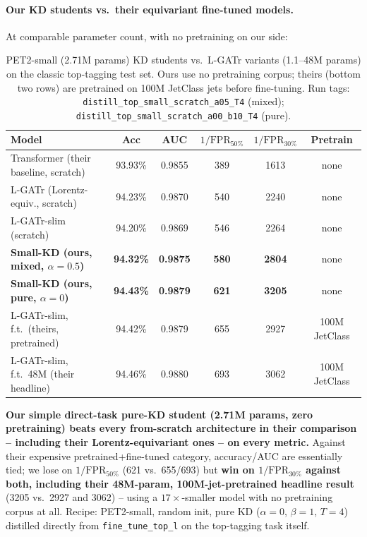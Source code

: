 \paragraph{Our KD students vs.\ their equivariant fine-tuned models.} At
comparable parameter count, with no pretraining on our side:

\begin{table}[h]
    \centering
    \small
    \begin{tabular}{lccccc}
        \toprule
        Model & Acc & AUC & $1/\mathrm{FPR}_{50\%}$ & $1/\mathrm{FPR}_{30\%}$ & Pretrain \\
        \midrule
        Transformer (their baseline, scratch) & 93.93\% & 0.9855 & 389 & 1613 & none \\
        L-GATr (Lorentz-equiv., scratch) & 94.23\% & 0.9870 & 540 & 2240 & none \\
        L-GATr-slim (scratch) & 94.20\% & 0.9869 & 546 & 2264 & none \\
        \textbf{Small-KD (ours, mixed, $\alpha{=}0.5$)} & \textbf{94.32\%} & \textbf{0.9875} & \textbf{580} & \textbf{2804} & none \\
        \textbf{Small-KD (ours, pure, $\alpha{=}0$)} & \textbf{94.43\%} & \textbf{0.9879} & \textbf{621} & \textbf{3205} & none \\
        L-GATr-slim, f.t.\ (theirs, pretrained) & 94.42\% & 0.9879 & 655 & 2927 & 100M JetClass \\
        L-GATr-slim, f.t.\ 48M (their headline) & 94.46\% & 0.9880 & 693 & 3062 & 100M JetClass \\
        \bottomrule
    \end{tabular}
    \caption{PET2-small (2.71M params) KD students vs.\ L-GATr variants
    (1.1--48M params) on the classic top-tagging test set. Ours use no
    pretraining corpus; theirs (bottom two rows) are pretrained on 100M
    JetClass jets before fine-tuning. Run tags:
    \texttt{distill\_top\_small\_scratch\_a05\_T4} (mixed);
    \texttt{distill\_top\_small\_scratch\_a00\_b10\_T4} (pure).}
    \label{tab:lgatr-comparison}
\end{table}

\textbf{Our simple direct-task pure-KD student (2.71M params, zero
pretraining) beats every from-scratch architecture in their comparison --
including their Lorentz-equivariant ones -- on every metric.} Against their
expensive pretrained+fine-tuned category, accuracy/AUC are essentially tied;
we lose on $1/\mathrm{FPR}_{50\%}$ (621 vs.\ 655/693) but \textbf{win on
$1/\mathrm{FPR}_{30\%}$ against both, including their 48M-param,
100M-jet-pretrained headline result} (3205 vs.\ 2927 and 3062) -- using a
$17\times$-smaller model with no pretraining corpus at all. Recipe: PET2-small,
random init, pure KD ($\alpha{=}0$, $\beta{=}1$, $T{=}4$) distilled directly
from \texttt{fine\_tune\_top\_l} on the top-tagging task itself.

